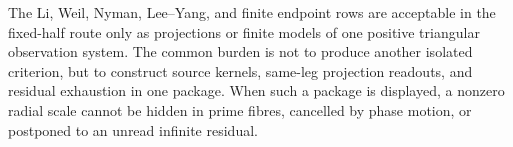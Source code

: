 \begin{principle}
\label{prin:rh-single-positive-triangle-burden}
The Li, Weil, Nyman, Lee--Yang, and finite endpoint rows are acceptable
in the fixed-half route only as projections or finite models of one
positive triangular observation system.  The common burden is not to
produce another isolated criterion, but to construct source kernels,
same-leg projection readouts, and residual exhaustion in one package.
When such a package is displayed, a nonzero radial scale cannot be
hidden in prime fibres, cancelled by phase motion, or postponed to an
unread infinite residual.
\end{principle}
